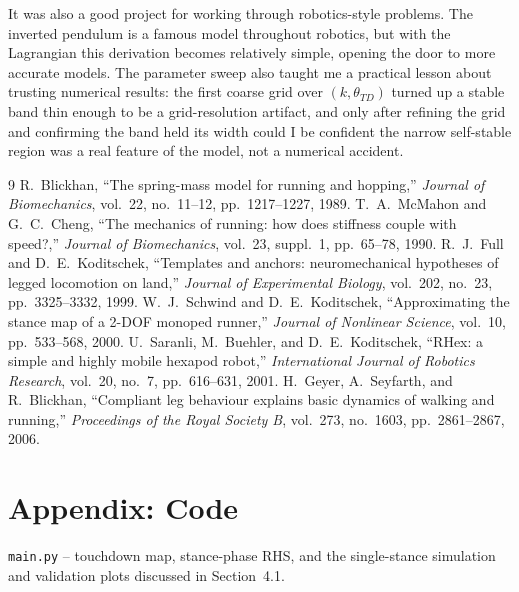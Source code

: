 \documentclass[11pt]{article}
\begin{document}
It was also a good project for working through robotics-style problems. The inverted pendulum is a famous model
throughout robotics, but with the Lagrangian this derivation becomes relatively simple, opening the door to more
accurate models. The parameter sweep also taught me a practical lesson about trusting numerical results: the first
coarse grid over $(k,\theta_{TD})$ turned up a stable band thin enough to be a grid-resolution artifact, and only
after refining the grid and confirming the band held its width could I be confident the narrow self-stable region
was a real feature of the model, not a numerical accident.



\newpage
\footnotesize
\begin{thebibliography}{9}
\setlength{\itemsep}{0pt}
R.~Blickhan, ``The spring-mass model for running and hopping,''
\textit{Journal of Biomechanics}, vol.~22, no.~11--12, pp.~1217--1227,
1989.
T.~A.~McMahon and G.~C.~Cheng, ``The mechanics of running: how does
stiffness couple with speed?,'' \textit{Journal of Biomechanics},
vol.~23, suppl.~1, pp.~65--78, 1990.
R.~J.~Full and D.~E.~Koditschek, ``Templates and anchors:
neuromechanical hypotheses of legged locomotion on land,''
\textit{Journal of Experimental Biology}, vol.~202, no.~23,
pp.~3325--3332, 1999.
W.~J.~Schwind and D.~E.~Koditschek, ``Approximating the stance map of
a 2-DOF monoped runner,'' \textit{Journal of Nonlinear Science},
vol.~10, pp.~533--568, 2000.
U.~Saranli, M.~Buehler, and D.~E.~Koditschek, ``RHex: a simple and
highly mobile hexapod robot,'' \textit{International Journal of
Robotics Research}, vol.~20, no.~7, pp.~616--631, 2001.
H.~Geyer, A.~Seyfarth, and R.~Blickhan, ``Compliant leg behaviour
explains basic dynamics of walking and running,'' \textit{Proceedings
of the Royal Society B}, vol.~273, no.~1603, pp.~2861--2867, 2006.
\end{thebibliography}

\normalsize

\appendix
\section*{Appendix: Code}
\texttt{main.py} -- touchdown map, stance-phase RHS, and the
single-stance simulation and validation plots discussed in
Section~4.1.

\end{document}
